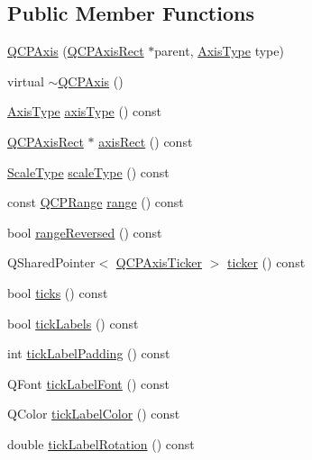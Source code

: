 \subsection*{Public Member Functions}
\begin{DoxyCompactItemize}
\item 
\hyperlink{class_q_c_p_axis_ac62c042968bae0e6d474fcfc57c9b71f}{Q\+C\+P\+Axis} (\hyperlink{class_q_c_p_axis_rect}{Q\+C\+P\+Axis\+Rect} $\ast$parent, \hyperlink{class_q_c_p_axis_ae2bcc1728b382f10f064612b368bc18a}{Axis\+Type} type)
\item 
virtual \hyperlink{class_q_c_p_axis_a7cfa27ea9da0bb1fe0ae995572c0b85d}{$\sim$\+Q\+C\+P\+Axis} ()
\item 
\hyperlink{class_q_c_p_axis_ae2bcc1728b382f10f064612b368bc18a}{Axis\+Type} \hyperlink{class_q_c_p_axis_aa19679359783c5ecd27757b7e5619976}{axis\+Type} () const
\item 
\hyperlink{class_q_c_p_axis_rect}{Q\+C\+P\+Axis\+Rect} $\ast$ \hyperlink{class_q_c_p_axis_afc94bcfdf8adfe8e01013f13bdf159a2}{axis\+Rect} () const
\item 
\hyperlink{class_q_c_p_axis_a36d8e8658dbaa179bf2aeb973db2d6f0}{Scale\+Type} \hyperlink{class_q_c_p_axis_ad23e9ad97b44e9aeaf4fab8904280098}{scale\+Type} () const
\item 
const \hyperlink{class_q_c_p_range}{Q\+C\+P\+Range} \hyperlink{class_q_c_p_axis_ac4058855a81f1a883cf2e754f6a6acb1}{range} () const
\item 
bool \hyperlink{class_q_c_p_axis_ab9866dd1a78f1920f491ec12a794bec2}{range\+Reversed} () const
\item 
Q\+Shared\+Pointer$<$ \hyperlink{class_q_c_p_axis_ticker}{Q\+C\+P\+Axis\+Ticker} $>$ \hyperlink{class_q_c_p_axis_a7b7a27151be8235059e1294f73ecf615}{ticker} () const
\item 
bool \hyperlink{class_q_c_p_axis_a5c3da767a2dc990f200856a9e27ea06e}{ticks} () const
\item 
bool \hyperlink{class_q_c_p_axis_ae4158bbc52939ee52cdb12b805860a28}{tick\+Labels} () const
\item 
int \hyperlink{class_q_c_p_axis_afac7316ca35941e7080f98e0022c1891}{tick\+Label\+Padding} () const
\item 
Q\+Font \hyperlink{class_q_c_p_axis_a09f339b7125cf1094920f86687b88236}{tick\+Label\+Font} () const
\item 
Q\+Color \hyperlink{class_q_c_p_axis_a9e21b2326bb2de0b7a8efcd1efc0ce78}{tick\+Label\+Color} () const
\item 
double \hyperlink{class_q_c_p_axis_a5c81e5d550266fdb9e11d96d1dc5713e}{tick\+Label\+Rotation} () const

\end{DoxyCompactItemize}
